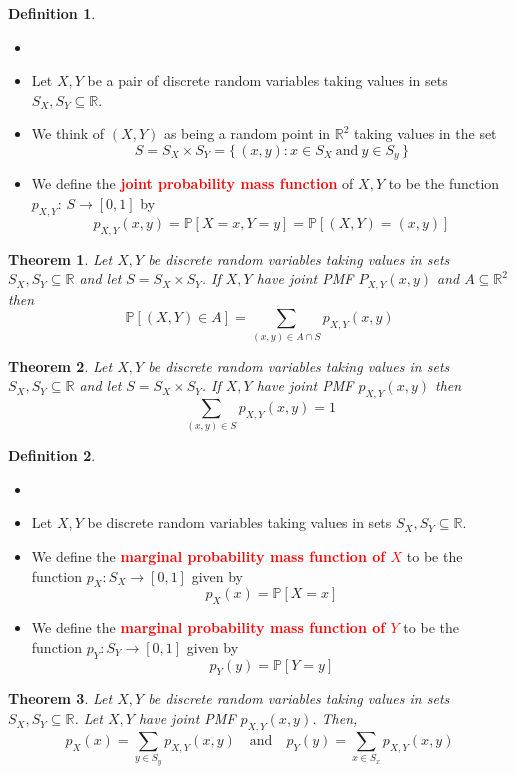 \documentclass{article}
\newcommand{\PP}{\mathbb{P}}
\newcommand{\R}{\mathbb{R}}
\newcommand{\bfred}[1]{\textcolor{red}{\textbf{#1}}}
\theoremstyle{plain}
\newtheorem{thm}{Theorem}[section]
\theoremstyle{definition}
\newtheorem{defn}{Definition}[section]
\theoremstyle{remark}
\begin{document}
\begin{defn}
    \begin{itemize}
        \item []
        \item Let $X,Y$ be a pair of discrete random variables taking values in sets $S_X,S_Y\subseteq\R$.
        \item We think of $(X,Y)$ as being a random point in $\R^2$ taking values in the set \[S=S_X\times S_Y=\{\,(x,y):x\in S_X \ \text{and} \ y\in S_y\,\}\] 
        \item We define the \bfred{joint probability mass function} of $X,Y$ to be the function $p_{X,Y}$: $S\rightarrow[0,1]$ by \[p_{X,Y}(x,y)=\PP[X=x,Y=y]=\PP[(X,Y)=(x,y)]\]
    \end{itemize}
\end{defn}

\begin{thm}
    Let $X,Y$ be discrete random variables taking values in sets $S_X,S_Y\subseteq\R$ and let $S=S_X\times S_Y$. If $X,Y$ have joint PMF $P_{X,Y}(x,y)$ and $A\subseteq\R^2$ then \[\PP[(X,Y)\in A]=\sum_{(x,y)\in A \cap S}p_{X,Y}(x,y)\]
\end{thm}

\begin{thm}
    Let $X,Y$ be discrete random variables taking values in sets $S_X,S_Y\subseteq\R$ and let $S=S_X\times S_Y$. If $X,Y$ have joint PMF $p_{X,Y}(x,y)$ then \[\sum_{(x,y)\in S}p_{X,Y}(x,y)=1\]
\end{thm}

\begin{defn}
    \begin{itemize}
        \item []
        \item Let $X,Y$ be discrete random variables taking values in sets $S_X,S_Y\subseteq\R$.
        \item We define the \bfred{marginal probability mass function of $X$} to be the function $p_X:S_X\rightarrow[0,1]$ given by \[p_X(x)=\PP[X=x]\] 
        \item We define the \bfred{marginal probability mass function of $Y$} to be the function $p_Y:S_Y\rightarrow[0,1]$ given by \[p_Y(y)=\PP[Y=y]\]
    \end{itemize}
\end{defn}

\begin{thm}
    Let $X,Y$ be discrete random variables taking values in sets $S_X,S_Y\subseteq\R$. Let $X,Y$ have joint PMF $p_{X,Y}(x,y)$. Then, \[p_X(x)=\sum_{y\in S_y}p_{X,Y}(x,y)\quad\text{and}\quad p_Y(y)=\sum_{x\in S_x}p_{X,Y}(x,y)\]
\end{thm}
\end{document}

